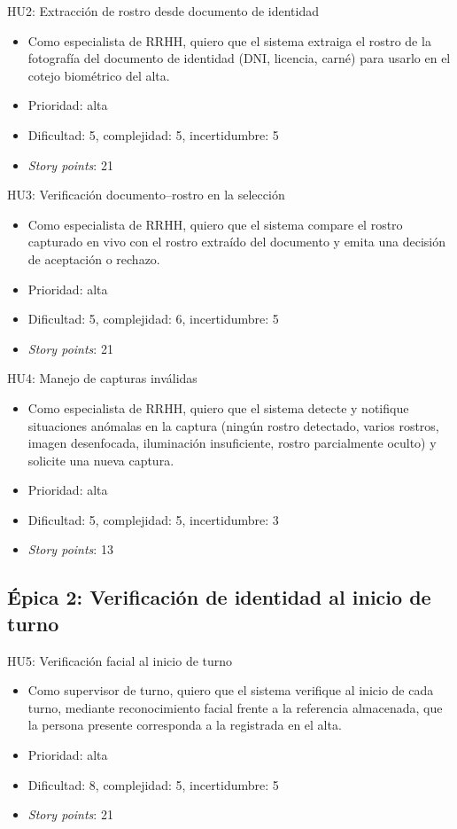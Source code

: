 \documentclass[
  11pt, %
]{charter}
\begin{document}
HU2: Extracción de rostro desde documento de identidad
\begin{itemize}
  \item Como especialista de RRHH, quiero que el sistema extraiga el rostro de la fotografía del documento de identidad (DNI, licencia, carné) para usarlo en el cotejo biométrico del alta.
  \item Prioridad: alta
  \item Dificultad: 5, complejidad: 5, incertidumbre: 5
  \item \textit{Story points}: 21
\end{itemize}

HU3: Verificación documento--rostro en la selección
\begin{itemize}
  \item Como especialista de RRHH, quiero que el sistema compare el rostro capturado en vivo con el rostro extraído del documento y emita una decisión de aceptación o rechazo.
  \item Prioridad: alta
  \item Dificultad: 5, complejidad: 6, incertidumbre: 5
  \item \textit{Story points}: 21
\end{itemize}

HU4: Manejo de capturas inválidas
\begin{itemize}
  \item Como especialista de RRHH, quiero que el sistema detecte y notifique situaciones anómalas en la captura (ningún rostro detectado, varios rostros, imagen desenfocada, iluminación insuficiente, rostro parcialmente oculto) y solicite una nueva captura.
  \item Prioridad: alta
  \item Dificultad: 5, complejidad: 5, incertidumbre: 3
  \item \textit{Story points}: 13
\end{itemize}

\subsection{Épica 2: Verificación de identidad al inicio de turno}

HU5: Verificación facial al inicio de turno
\begin{itemize}
  \item Como supervisor de turno, quiero que el sistema verifique al inicio de cada turno, mediante reconocimiento facial frente a la referencia almacenada, que la persona presente corresponda a la registrada en el alta.
  \item Prioridad: alta
  \item Dificultad: 8, complejidad: 5, incertidumbre: 5
  \item \textit{Story points}: 21
\end{itemize}
\end{document}
